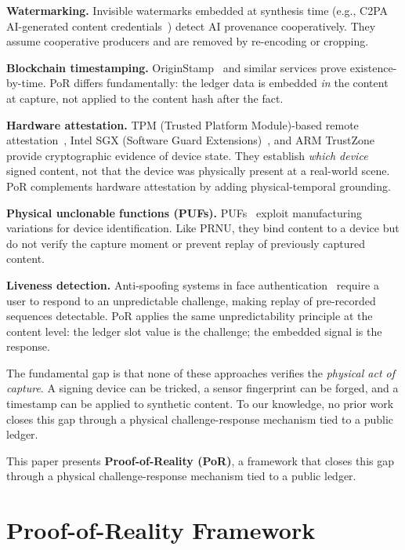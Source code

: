 \documentclass[11pt]{article}
\begin{document}
\textbf{Watermarking.} Invisible watermarks embedded at synthesis time
(e.g., C2PA AI-generated content credentials~\cite{watermarking}) detect AI
provenance cooperatively. They assume cooperative producers and are removed by
re-encoding or cropping.

\textbf{Blockchain timestamping.} OriginStamp~\cite{originstamp} and similar
services prove existence-by-time. PoR differs fundamentally: the ledger data is
embedded \emph{in} the content at capture, not applied to the content hash
after the fact.

\textbf{Hardware attestation.} TPM (Trusted Platform Module)-based remote
attestation~\cite{tpm}, Intel SGX (Software Guard Extensions)~\cite{sgx}, and
ARM TrustZone provide cryptographic evidence of device state. They establish
\emph{which device} signed content, not that the device was physically present
at a real-world scene. PoR complements hardware attestation by adding
physical-temporal grounding.

\textbf{Physical unclonable functions (PUFs).} PUFs~\cite{puf} exploit
manufacturing variations for device identification. Like PRNU, they bind
content to a device but do not verify the capture moment or prevent replay of
previously captured content.

\textbf{Liveness detection.} Anti-spoofing systems in face
authentication~\cite{liveness} require a user to respond to an unpredictable
challenge, making replay of pre-recorded sequences detectable. PoR applies the
same unpredictability principle at the content level: the ledger slot value is
the challenge; the embedded signal is the response.

The fundamental gap is that none of these approaches verifies the
\emph{physical act of capture}. A signing device can be tricked, a sensor
fingerprint can be forged, and a timestamp can be applied to synthetic content.
To our knowledge, no prior work closes this gap through a physical
challenge-response mechanism tied to a public ledger.

This paper presents \textbf{Proof-of-Reality (PoR)}, a framework that closes
this gap through a physical challenge-response mechanism tied to a public ledger.


\section{Proof-of-Reality Framework}
\label{sec:por}
\end{document}

